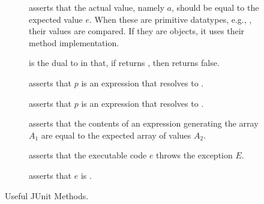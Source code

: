\begin{figure}[tp]
    \small
    \begin{tcolorbox}[title=JUnit 5 Testing Methods]
    \begin{description}
      \item [] asserts that the actual value, namely $a$, should be equal to the expected value $e$. When these are primitive datatypes, e.g., , their values are compared. If they are objects, it uses their  method implementation.
      \item [] is the dual to  in that, if  returns , then  returns false.
      \item [] asserts that $p$ is an expression that resolves to .
      \item [] asserts that $p$ is an expression that resolves to .
      \item [] asserts that the contents of an expression generating the array $A_1$ are equal to the expected array of values $A_2$. 
      \item [] asserts that the executable code $e$ throws the exception $E$.
      \item [] asserts that $e$ is .
    \end{description}
  \end{tcolorbox}
    \caption{Useful JUnit Methods.}
    \label{fig:testingmethods}
  \end{figure}



